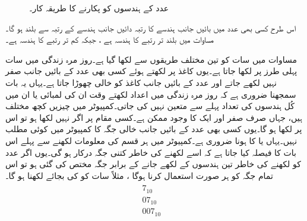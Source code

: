 \begin{figure}
\centering
\begin{subfigure}{0.45\textwidth}
\centering
{}
\end{subfigure}\hfill
\begin{subfigure}{0.45\textwidth}
\centering
{}
\end{subfigure}
\caption{عدد کے ہندسوں کو پکارنے کا طریقہ کار۔}
\label{شکل_ثنائی_ہندسوں_کے_نام}
\end{figure}

	اس طرح کسی بھی عدد میں بائیں جانب  ہندسے کا رتبہ  دائیں جانب  ہندسے  کے رتبہ سے بلند ہو گا۔مساوات   میں بلند تر رتبے  کا  ہندسہ  ہے ، جبکہ کم تر رتبے کا   ہندسہ ہے۔
	
	مساوات    میں سات کو تین مختلف طریقوں سے لکھا گیا ہے۔روز مرہ زندگی میں سات  پہلی طرز پر لکھا جاتا ہے۔یوں کاغذ پر لکھتے ہوئے کسی بھی عدد کے بائیں جانب صفر نہیں لکھے جاتے اور   عدد کے بائیں  جانب کاغذ کو خالی چھوڑا جاتا ہے۔یہاں یہ بات سمجھنا ضروری ہے کہ روز مرہ زندگی میں اعداد لکھتے وقت ان کی لمبائی یا ان میں کُل ہندسوں کی تعداد پہلے سے متعین نہیں کی جاتی۔کمپیوٹر میں چیزیں  کچھ  مختلف ہیں، جہاں صرف صفر  اور ایک   کا وجود ممکن ہے۔کسی مقام پر اگر   نہیں لکھا ہو تو اس پر   لکھا ہو  گا۔یوں کسی بھی عدد کے بائیں جانب خالی جگہ کا کمپیوٹر میں کوئی مطلب نہیں۔یہاں     یا    کا ہونا ضروری ہے۔کمپیوٹر میں ہر قسم کی معلومات لکھنے سے پہلے اس بات کا فیصلہ کیا جاتا ہے کہ اسے لکھنے کی خاطر کتنی جگہ  درکار ہو گی۔یوں اگر  عدد کو لکھنے کی خاطر تین ہندسوں کے لکھے جانے کے برابر جگہ مختص  کی گئی ہو تو اس تمام جگہ کو ہر صورت استعمال کرنا ہوگا ، مثلاً  سات کو       کی بجائے   لکھنا ہو گا۔
\begin{gather}
\begin{aligned}\label{مساوات_ثنائی_ہندسوں}
7_{10} &\\
07_{10}&\\
007_{10}&
\end{aligned}
\end{gather}


